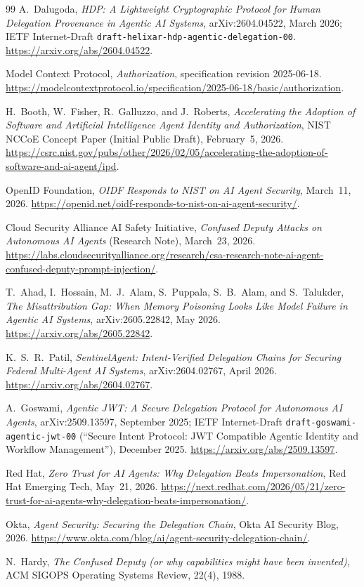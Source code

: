 \documentclass[11pt]{article}
\newcommand{\code}[1]{\texttt{#1}}
\begin{document}
\begin{thebibliography}{99}
 A.~Dalugoda, \emph{HDP: A Lightweight Cryptographic Protocol for
Human Delegation Provenance in Agentic AI Systems}, arXiv:2604.04522, March
2026; IETF Internet-Draft \code{draft-helixar-hdp-agentic-delegation-00}.
\url{https://arxiv.org/abs/2604.04522}.

 Model Context Protocol, \emph{Authorization}, specification
revision 2025-06-18.
\url{https://modelcontextprotocol.io/specification/2025-06-18/basic/authorization}.

 H.~Booth, W.~Fisher, R.~Galluzzo, and J.~Roberts,
\emph{Accelerating the Adoption of Software and Artificial Intelligence Agent
Identity and Authorization}, NIST NCCoE Concept Paper (Initial Public Draft),
February~5, 2026.
\url{https://csrc.nist.gov/pubs/other/2026/02/05/accelerating-the-adoption-of-software-and-ai-agent/ipd}.

 OpenID Foundation, \emph{OIDF Responds to NIST on AI Agent
Security}, March~11, 2026.
\url{https://openid.net/oidf-responds-to-nist-on-ai-agent-security/}.

 Cloud Security Alliance AI Safety Initiative, \emph{Confused
Deputy Attacks on Autonomous AI Agents} (Research Note), March~23, 2026.
\url{https://labs.cloudsecurityalliance.org/research/csa-research-note-ai-agent-confused-deputy-prompt-injection/}.

 T.~Ahad, I.~Hossain, M.~J.~Alam, S.~Puppala,
S.~B.~Alam, and S.~Talukder, \emph{The Misattribution Gap: When Memory Poisoning
Looks Like Model Failure in Agentic AI Systems}, arXiv:2605.22842, May 2026.
\url{https://arxiv.org/abs/2605.22842}.

 K.~S.~R.~Patil, \emph{SentinelAgent: Intent-Verified
Delegation Chains for Securing Federal Multi-Agent AI Systems}, arXiv:2604.02767,
April 2026. \url{https://arxiv.org/abs/2604.02767}.

 A.~Goswami, \emph{Agentic JWT: A Secure Delegation Protocol
for Autonomous AI Agents}, arXiv:2509.13597, September 2025; IETF Internet-Draft
\code{draft-goswami-agentic-jwt-00} (``Secure Intent Protocol: JWT Compatible
Agentic Identity and Workflow Management''), December 2025.
\url{https://arxiv.org/abs/2509.13597}.

 Red Hat, \emph{Zero Trust for AI Agents: Why Delegation
Beats Impersonation}, Red Hat Emerging Tech, May~21, 2026.
\url{https://next.redhat.com/2026/05/21/zero-trust-for-ai-agents-why-delegation-beats-impersonation/}.

 Okta, \emph{Agent Security: Securing the Delegation Chain},
Okta AI Security Blog, 2026.
\url{https://www.okta.com/blog/ai/agent-security-delegation-chain/}.

 N.~Hardy, \emph{The Confused Deputy (or why capabilities might
have been invented)}, ACM SIGOPS Operating Systems Review, 22(4), 1988.

\end{thebibliography}
\end{document}
